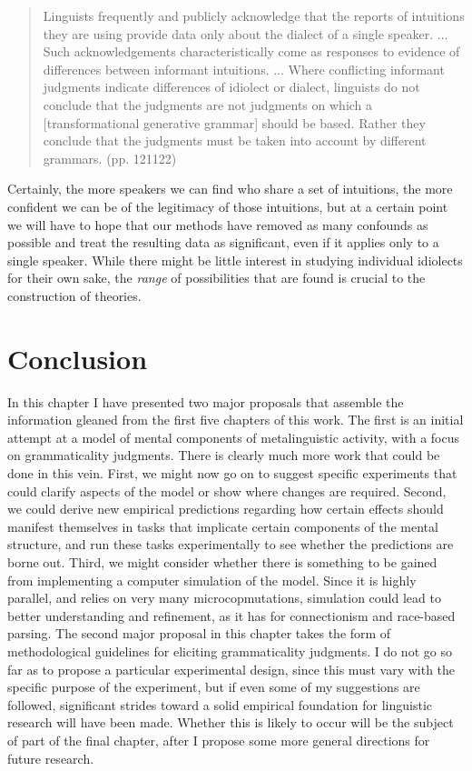  \begin{quote}
 Linguists frequently and publicly acknowledge that the reports of intuitions they are using provide data only about the dialect of a single speaker. ... Such acknowledgements characteristically come as responses to evidence of differences between informant intuitions. ... Where conflicting informant judgments indicate differences of idiolect or dialect, linguists do not conclude that the judgments are not judgments on which a [transformational generative grammar] should be based. Rather they conclude that the judgments must be taken into account by different grammars. (pp. 121\textendash{}122)
 \end{quote}

 \noindent
 Certainly, the more speakers we can find who share a set of intuitions, the more confident we can be of the legitimacy of those intuitions, but at a certain point we will have to hope that our methods have removed as many confounds as possible and treat the resulting data as significant, even if it applies only to a single speaker. While there might be little interest in studying individual idiolects for their own sake, the \textit{range} of possibilities that are found is crucial to the construction of theories.

 \section{Conclusion}\label{sec:6.4}

 In this chapter I have presented two major proposals that assemble the information gleaned from the first five chapters of this work. The first is an initial attempt at a model of mental components of metalinguistic activity, with a focus on grammaticality judgments. There is clearly much more work that could be done in this vein. First, we might now go on to suggest specific experiments that could clarify aspects of the model or show where changes are required. Second, we could derive new empirical predictions regarding how certain effects should manifest themselves in tasks that implicate certain components of the mental structure, and run these tasks experimentally to see whether the predictions are borne out. Third, we might consider whether there is something to be gained from implementing a computer simulation of the model. Since it is highly parallel, and
 relies on very many microcopmutations, simulation could lead to better understanding and refinement, as it has for connectionism and race-based parsing. The second major proposal  in this chapter takes the form of methodological guidelines for eliciting grammaticality judgments. I do not go so far as to propose a particular experimental design, since this must vary with the specific purpose of the experiment, but if even some of my suggestions are followed, significant strides toward a solid empirical foundation for linguistic research will have been made. Whether this is likely to occur will be the subject of part of the final chapter, after I propose some more general directions for future research.